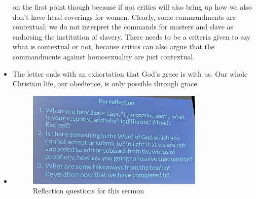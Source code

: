 \begin{itemize}
{{  on the first point though because if not critics will also bring up how we
  also don't have head coverings for women. Clearly, some commandments are
  contextual; we do not interpret the commands for masters and slave as
  endorsing the institution of slavery. There needs to be a criteria given to
  say what is contextual or not, because critics can also argue that the
  commandments against homosexuality are just contextual. }}
  \item{The letter ends with an exhortation that God's grace is with us. Our whole Christian life, our obedience, is only possible through grace. }
  \item{\begin{figure}[H]
    \centering
    \includegraphics[width=0.8\textwidth, trim={0cm 0cm 0cm 0cm},clip]{Figures/maySermon2Reflections.jpg}
    \caption[]{Reflection questions for this sermon}
    \label{}
  \end{figure}}
\end{itemize}